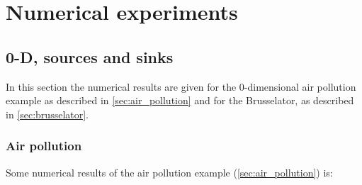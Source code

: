 \chapter{Numerical experiments}\label{sec:numerical_experiments}
\section{0-D, sources and sinks}\label{sec:0d_numerical_experiments}
In this section the numerical results are given for the
0-dimensional air pollution example as described in \autoref{sec:air_pollution}
and for the Brusselator, as described in \autoref{sec:brusselator}.
\subsection{Air pollution}
Some numerical results of the air pollution example (\autoref{sec:air_pollution}) is:
